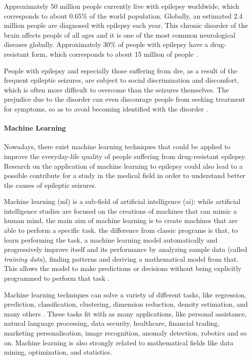 Approximately 50 million people currently live with epilepsy worldwide, which corresponds to about 0.65\% of the world population. Globally, an estimated 2.4 million people are diagnosed with epilepsy each year. This chronic disorder of the brain affects people of all ages and it is one of the most common neurological diseases globally. Approximately 30\% of people with epilepsy have a drug-resistant form, which corresponds to about 15 million of people \cite{WHO:epilepsy}.

People with epilepsy and especially those suffering from \acs{dre}, as a result of the frequent epileptic seizures, are subject to social discrimination and discomfort, which is often more difficult to overcome than the seizures themselves. The prejudice due to the disorder can even discourage people from seeking treatment for symptoms, so as to avoid becoming identified with the disorder \cite{WHO:epilepsy}.

\paragraph{Machine Learning} Nowadays, there exist machine learning techniques that could be applied to improve the everyday-life quality of people suffering from drug-resistant epilepsy. Research on the application of machine learning to epilepsy could also lead to a possible contribute for a study in the medical field in order to understand better the causes of epileptic seizures.

Machine learning (\acs{ml}) is a sub-field of artificial intelligence (\acs{ai}): while artificial intelligence studies are focused on the creations of machines that can mimic a human mind, the main aim of machine learning is to create machines that are able to perform a specific task. the difference from classic programs is that, to learn performing the task, a machine learning model automatically and progressively improve itself and its performance by analyzing sample data (called \textit{training data}), finding patterns and deriving a mathematical model from that. This allows the model to make predictions or decisions without being explicitly programmed to perform that task \cite{Springer:patternrecognitionandml}.

Machine learning techniques can solve a variety of different tasks, like regression, prediction, classification, clustering, dimension reduction, density estimation, and many others \cite{Springer:patternrecognitionandml}. These tasks fit with as many applications, like personal assistance, natural language processing, data security, healthcare, financial trading, marketing personalisation, image recognition, anomaly detection, robotics and so on. Machine learning is also strongly related to mathematical fields like data mining, optimization, and statistics.

